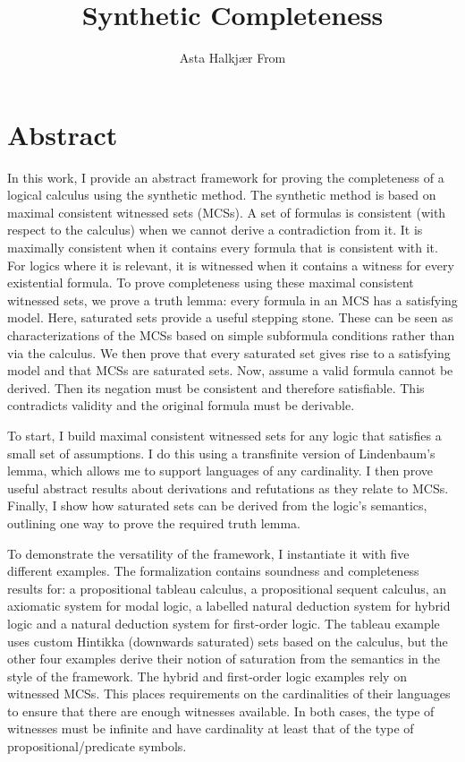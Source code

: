 \documentclass[11pt,a4paper,oneside]{book}
\begin{document}
\title{Synthetic Completeness}
\author{Asta Halkjær From}
\maketitle

\setcounter{page}{2}

\chapter*{Abstract}

In this work, I provide an abstract framework for proving the completeness of a logical calculus using the synthetic method.
The synthetic method is based on maximal consistent witnessed sets (MCSs).
A set of formulas is consistent (with respect to the calculus) when we cannot derive a contradiction from it.
It is maximally consistent when it contains every formula that is consistent with it.
For logics where it is relevant, it is witnessed when it contains a witness for every existential formula.
To prove completeness using these maximal consistent witnessed sets, we prove a truth lemma: every formula in an MCS has a satisfying model.
Here, saturated sets provide a useful stepping stone.
These can be seen as characterizations of the MCSs based on simple subformula conditions rather than via the calculus.
We then prove that every saturated set gives rise to a satisfying model and that MCSs are saturated sets.
Now, assume a valid formula cannot be derived.
Then its negation must be consistent and therefore satisfiable.
This contradicts validity and the original formula must be derivable.

To start, I build maximal consistent witnessed sets for any logic that satisfies a small set of assumptions.
I do this using a transfinite version of Lindenbaum's lemma, which allows me to support languages of any cardinality.
I then prove useful abstract results about derivations and refutations as they relate to MCSs.
Finally, I show how saturated sets can be derived from the logic's semantics, outlining one way to prove the required truth lemma.

To demonstrate the versatility of the framework, I instantiate it with five different examples.
The formalization contains soundness and completeness results for:
a propositional tableau calculus,
a propositional sequent calculus,
an axiomatic system for modal logic,
a labelled natural deduction system for hybrid logic and
a natural deduction system for first-order logic.
The tableau example uses custom Hintikka (downwards saturated) sets based on the calculus, but the other four examples derive their notion of saturation from the semantics in the style of the framework.
The hybrid and first-order logic examples rely on witnessed MCSs.
This places requirements on the cardinalities of their languages to ensure that there are enough witnesses available.
In both cases, the type of witnesses must be infinite and have cardinality at least that of the type of propositional/predicate symbols.
\end{document}
